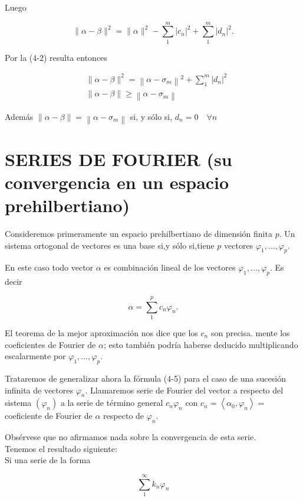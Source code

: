 \documentclass[10pt]{article}
\theoremstyle{plain}
\theoremstyle{definition}
\theoremstyle{remark}
\begin{document}
Luego

$$
\|\alpha-\beta\|^{2}=\|\alpha\|^{2}-\sum_{1}^{m}\left|c_{n}\right|^{2}+\sum_{1}^{m}\left|d_{n}\right|^{2} .
$$

Por la (4-2) resulta entonces


\begin{align*}
& \|\alpha-\beta\|^{2}=\left\|\alpha-\sigma_{m}\right\|^{2}+\sum_{1}^{m}\left|d_{n}\right|^{2}  \tag{4-4}\\
& \|\alpha-\beta\| \geqslant\left\|\alpha-\sigma_{m}\right\|
\end{align*}


Además $\|\alpha-\beta\|=\left\|\alpha-\sigma_{m}\right\|$ si, y sólo si, $d_{n}=0 \quad \forall n$

\section*{SERIES DE FOURIER (su convergencia en un espacio prehilbertiano)}
Consideremos primeramente un espacio prehilbertiano de dimensión finita $p$. Un sistema ortogonal de vectores es una base si,y sólo si,tiene $p$ vectores $\varphi_{1}, \ldots, \varphi_{p}$.

En este caso todo vector $\alpha$ es combinación lineal de los vectores $\varphi_{1}, \ldots, \varphi_{p}$. Es decir


\begin{equation*}
\alpha=\sum_{1}^{p} c_{n} \varphi_{n} . \tag{4-5}
\end{equation*}


El teorema de la mejor aproximación nos dice que los $c_{n}$ son precisa. mente los coeficientes de Fourier de $\alpha$; esto también podría haberse deducido multiplicando escalarmente por $\varphi_{1}, \ldots, \varphi_{p}$.

Trataremos de generalizar ahora la fórmula (4-5) para el caso de una sucesión infinita de vectores $\varphi_{n}$. Llamaremos serie de Fourier del vector a respecto del sistema $\left(\varphi_{n}\right)$ a la serie de término general $c_{n} \varphi_{n}$ con $c_{n}=\left\langle\alpha_{0}, \varphi_{n}\right\rangle=$ coeficiente de Fourier de $\alpha$ respecto de $\varphi_{n}$.

Obsérvese que no afirmamos nada sobre la convergencia de esta serie.\\
Tenemos el resultado siguiente:\\
Si una serie de la forma

$$
\sum_{1}^{\infty} k_{n} \varphi_{n}
$$
\end{document}
